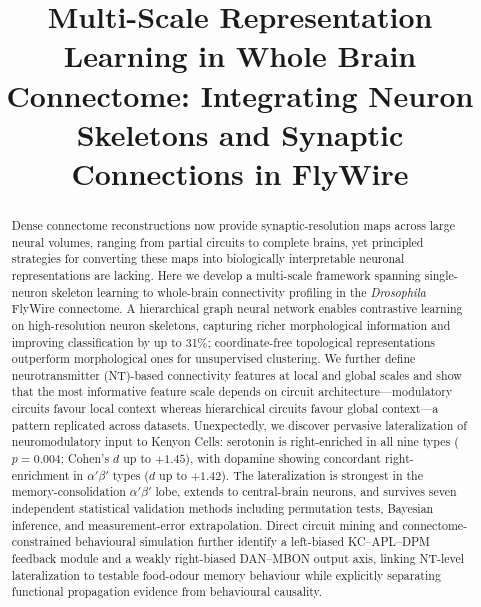 \documentclass[10pt]{article}
\title{\Large\bfseries Multi-Scale Representation Learning in Whole Brain Connectome: Integrating Neuron Skeletons and Synaptic Connections in FlyWire}
\author{}
\date{}
\begin{document}
\maketitle
\thispagestyle{empty}

\begin{abstract}
\noindent
Dense connectome reconstructions now provide synaptic-resolution maps across large neural volumes, ranging from partial circuits to complete brains, yet principled strategies for converting these maps into biologically interpretable neuronal representations are lacking. Here we develop a multi-scale framework spanning single-neuron skeleton learning to whole-brain connectivity profiling in the \textit{Drosophila} FlyWire connectome. A hierarchical graph neural network enables contrastive learning on high-resolution neuron skeletons, capturing richer morphological information and improving classification by up to 31\%; coordinate-free topological representations outperform morphological ones for unsupervised clustering. We further define neurotransmitter (NT)-based connectivity features at local and global scales and show that the most informative feature scale depends on circuit architecture---modulatory circuits favour local context whereas hierarchical circuits favour global context---a pattern replicated across datasets. Unexpectedly, we discover pervasive lateralization of neuromodulatory input to Kenyon Cells: serotonin is right-enriched in all nine types ($p = 0.004$; Cohen's $d$ up to $+1.45$), with dopamine showing concordant right-enrichment in $\alpha'\beta'$ types ($d$ up to $+1.42$). The lateralization is strongest in the memory-consolidation $\alpha'\beta'$ lobe, extends to central-brain neurons, and survives seven independent statistical validation methods including permutation tests, Bayesian inference, and measurement-error extrapolation. Direct circuit mining and connectome-constrained behavioural simulation further identify a left-biased KC--APL--DPM feedback module and a weakly right-biased DAN--MBON output axis, linking NT-level lateralization to testable food-odour memory behaviour while explicitly separating functional propagation evidence from behavioural causality.
\end{abstract}

\vspace{1em}

\end{document}
